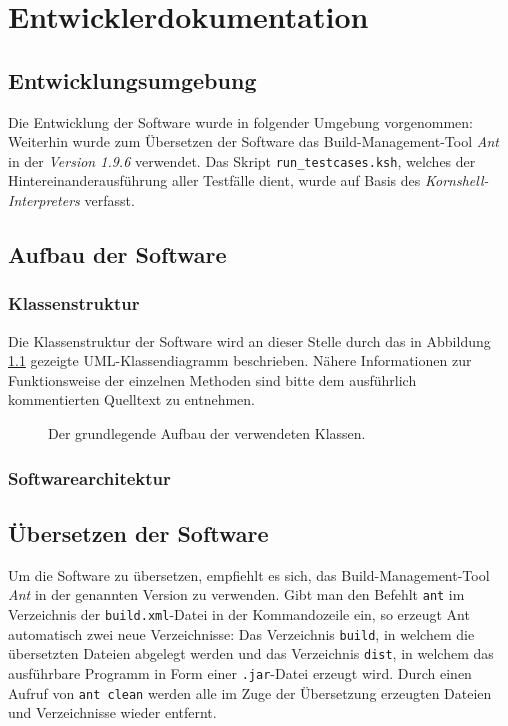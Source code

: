 \chapter{Entwicklerdokumentation}
\label{Entwicklerdokumentation}

\section{Entwicklungsumgebung}
Die Entwicklung der Software wurde in folgender Umgebung vorgenommen:
\makeenvironment
Weiterhin wurde zum \"Ubersetzen der Software das
Build-Management-Tool \textit{Ant} in der \textit{Version 1.9.6}
verwendet. Das Skript \texttt{run\_testcases.ksh}, welches der
Hintereinanderausf\"uhrung aller Testf\"alle dient, wurde auf Basis
des \textit{Kornshell-Interpreters} verfasst.

\section{Aufbau der Software}

\subsection{Klassenstruktur}

Die Klassenstruktur der Software wird an dieser Stelle durch das in
Abbildung \ref{klassendiagramm} gezeigte UML-Klassendiagramm
beschrieben. N\"ahere Informationen zur Funktionsweise der einzelnen
Methoden sind bitte dem ausf\"uhrlich kommentierten Quelltext zu
entnehmen.

\begin{figure}
  \resizebox{\textwidth}{!}{
    
  }
  \caption{Der grundlegende Aufbau der verwendeten Klassen.}
  \label{klassendiagramm}
\end{figure}

\subsection{Softwarearchitektur}

\section{\"Ubersetzen der Software}

Um die Software zu \"ubersetzen, empfiehlt es sich, das
Build-Management-Tool \textit{Ant} in der genannten Version zu
verwenden. Gibt man den Befehlt \texttt{ant} im Verzeichnis der
\texttt{build.xml}-Datei in der Kommandozeile ein, so erzeugt Ant
automatisch zwei neue Verzeichnisse: Das Verzeichnis \texttt{build},
in welchem die \"ubersetzten Dateien abgelegt werden und das
Verzeichnis \texttt{dist}, in welchem das ausf\"uhrbare Programm in
Form einer \texttt{.jar}-Datei erzeugt wird.
Durch einen Aufruf von \texttt{ant clean} werden alle im Zuge der
\"Ubersetzung erzeugten Dateien und Verzeichnisse wieder entfernt.

